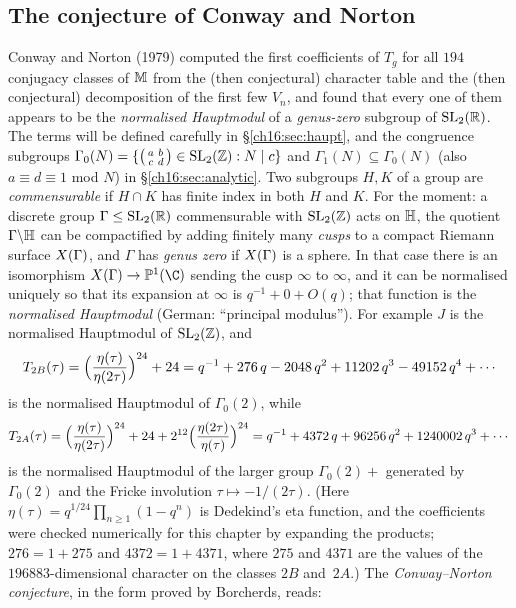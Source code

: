 \subsection{The conjecture of Conway and Norton}

Conway and Norton (1979) computed the first coefficients of $T_g$ for all $194$ conjugacy classes of $\mathbb{M}$
from the (then conjectural) character table and the (then conjectural) decomposition of the first few $V_n$, and
found that every one of them appears to be the \emph{normalised Hauptmodul} of a \emph{genus-zero} subgroup of
$\mathrm{SL}_2(\mathbb{R})$.  The terms will be defined carefully in \S\ref{ch16:sec:haupt}, and the congruence subgroups
$\Gamma_0(N)=\{\left(\begin{smallmatrix}a&b\\c&d\end{smallmatrix}\right)\in\mathrm{SL}_2(\mathbb{Z}): N\mid c\}$ and $\Gamma_1(N)\subseteq\Gamma_0(N)$ (also $a\equiv d\equiv1$
mod $N$) in \S\ref{ch16:sec:analytic}.  Two subgroups $H,K$ of a group are \emph{commensurable} if $H\cap K$ has finite
index in both $H$ and $K$.  For the moment: a discrete group
$\Gamma\le\mathrm{SL}_2(\mathbb{R})$ commensurable with $\mathrm{SL}_2(\mathbb{Z})$ acts on $\mathbb{H}$, the quotient $\Gamma\backslash
\mathbb{H}$ can be compactified by adding finitely many \emph{cusps} to a compact Riemann surface
$X(\Gamma)$, and $\Gamma$ has \emph{genus zero} if $X(\Gamma)$ is a sphere.  In that case there is an isomorphism
$\chsixteenX\to\chsixteenP(\C)$ sending the cusp $\infty$ to $\infty$, and it can be normalised uniquely so that its
expansion at $\infty$ is $q^{-1}+0+O(q)$; that function is the \emph{normalised Hauptmodul} (German:
``principal modulus'').  For example $J$ is the normalised Hauptmodul of $\mathrm{SL}_2(\mathbb{Z})$, and
\begin{equation}\label{ch16:eq:T2B}
  T_{2B}(\tau)=\Bigl(\frac{\eta(\tau)}{\eta(2\tau)}\Bigr)^{24}+24
  = q^{-1}+276\,q-2048\,q^2+11202\,q^3-49152\,q^4+\cdots
\end{equation}
is the normalised Hauptmodul of $\Gamma_0(2)$, while
\begin{equation}\label{ch16:eq:T2A}
  T_{2A}(\tau)=\Bigl(\frac{\eta(\tau)}{\eta(2\tau)}\Bigr)^{24}+24+2^{12}\Bigl(\frac{\eta(2\tau)}{\eta(\tau)}\Bigr)^{24}
  = q^{-1}+4372\,q+96256\,q^2+1240002\,q^3+\cdots
\end{equation}
is the normalised Hauptmodul of the larger group $\Gamma_0(2)+$ generated by $\Gamma_0(2)$ and the Fricke
involution $\tau\mapsto-1/(2\tau)$.  (Here $\eta(\tau)=q^{1/24}\prod_{n\ge1}(1-q^n)$ is Dedekind's eta function, and
the coefficients were checked numerically for this chapter by expanding the products; $276=1+275$ and
$4372=1+4371$, where $275$ and $4371$ are the values of the $196883$-dimensional character on the classes $2B$
and~$2A$.)  The \emph{Conway--Norton conjecture}, in the form proved by Borcherds, reads:

